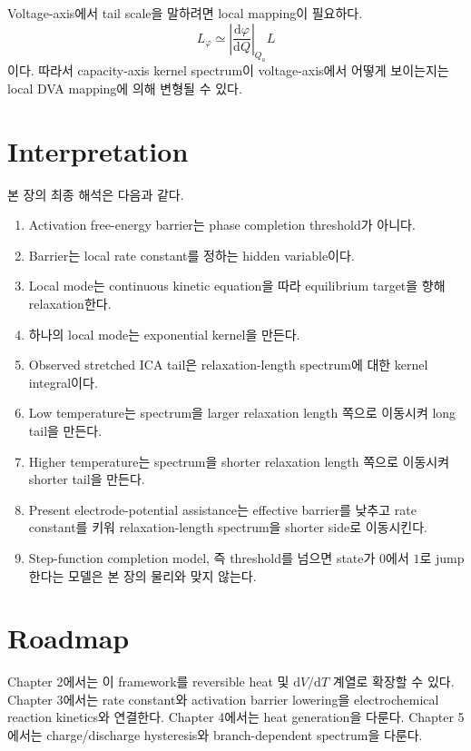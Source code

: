 \documentclass[11pt,a4paper]{article}
\newcommand{\dd}{\mathrm{d}}
\begin{document}
Voltage-axis에서 tail scale을 말하려면 local mapping이 필요하다.
\begin{equation}
L_\varphi
\simeq
\left|
\frac{\dd\varphi}{\dd Q}
\right|_{Q_a}
L
\end{equation}
이다. 따라서 capacity-axis kernel spectrum이 voltage-axis에서 어떻게 보이는지는 local DVA mapping에 의해 변형될 수 있다.

\section{Interpretation}

본 장의 최종 해석은 다음과 같다.

\begin{enumerate}
\item Activation free-energy barrier는 phase completion threshold가 아니다.
\item Barrier는 local rate constant를 정하는 hidden variable이다.
\item Local mode는 continuous kinetic equation을 따라 equilibrium target을 향해 relaxation한다.
\item 하나의 local mode는 exponential kernel을 만든다.
\item Observed stretched ICA tail은 relaxation-length spectrum에 대한 kernel integral이다.
\item Low temperature는 spectrum을 larger relaxation length 쪽으로 이동시켜 long tail을 만든다.
\item Higher temperature는 spectrum을 shorter relaxation length 쪽으로 이동시켜 shorter tail을 만든다.
\item Present electrode-potential assistance는 effective barrier를 낮추고 rate constant를 키워 relaxation-length spectrum을 shorter side로 이동시킨다.
\item Step-function completion model, 즉 threshold를 넘으면 state가 \(0\)에서 \(1\)로 jump한다는 모델은 본 장의 물리와 맞지 않는다.
\end{enumerate}

\section{Roadmap}

Chapter 2에서는 이 framework를 reversible heat 및 \(\dd V/\dd T\) 계열로 확장할 수 있다. Chapter 3에서는 rate constant와 activation barrier lowering을 electrochemical reaction kinetics와 연결한다. Chapter 4에서는 heat generation을 다룬다. Chapter 5에서는 charge/discharge hysteresis와 branch-dependent spectrum을 다룬다.
\end{document}
